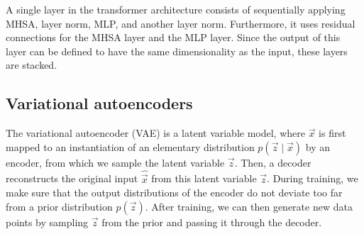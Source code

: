A single layer in the transformer architecture consists of sequentially applying MHSA, layer norm,
MLP, and another layer norm. Furthermore, it uses residual connections for the MHSA layer and the
MLP layer. Since the output of this layer can be defined to have the same dimensionality as the
input, these layers are stacked.

\subsection{Variational autoencoders}

The variational autoencoder (VAE) is a latent variable model, where $\vec{x}$ is first mapped to an
instantiation of an elementary distribution $p(\vec{z} \mid \vec{x})$ by an encoder, from which we
sample the latent variable $\vec{z}$. Then, a decoder reconstructs the original input
$\hat{\vec{x}}$ from this latent variable $\vec{z}$. During training, we make sure that the output
distributions of the encoder do not deviate too far from a prior distribution $p(\vec{z})$. After
training, we can then generate new data points by sampling $\vec{z}$ from the prior and passing it
through the decoder.

